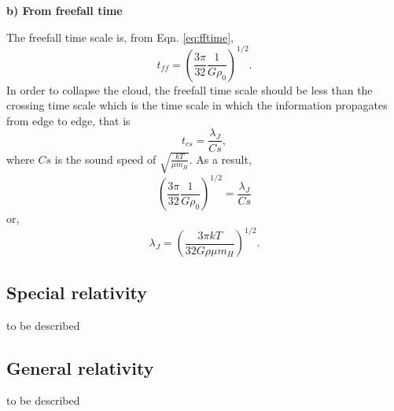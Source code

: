 \textbf{b) From freefall time}

The freefall time scale is, from Eqn. \ref{eq:fftime}, 
\begin{equation}
  t_{ff} = \left( \frac{3\pi}{32} \frac{1}{G \rho_{0}}\right)^{1/2}.
\end{equation}
In order to collapse the cloud, the freefall time scale should be less than the crossing time scale which 
is the time scale in which the information propagates from edge to edge, that is
\begin{equation}
   t_{cs} = \frac{\lambda_{J}}{Cs},
\end{equation}
where $Cs$ is the sound speed of $\sqrt{\frac{kT}{\mu m_{H}}}$. As a result,
\begin{equation}
   \left( \frac{3\pi}{32} \frac{1}{G \rho_{0}}\right)^{1/2} = \frac{\lambda_{J}}{Cs}
\end{equation}
or,
\begin{equation}
   \lambda_{J} = \left( \frac{3\pi k T}{32 G \rho \mu m_{H}} \right)^{1/2}.
\end{equation}

\bigskip
\subsection{Special relativity}
to be described

\bigskip
\subsection{General relativity}
to be described

%
%
